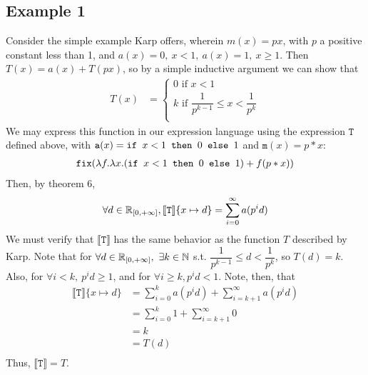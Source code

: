\subsection{Example 1}
Consider the simple example Karp offers, wherein $m(x) = px$, with $p$ a positive constant less than 1, and $a(x) = 0, \ x < 1, 
\ a(x) = 1, \ x \geq 1$. Then $T(x) = a(x) + T(px)$, so by a simple inductive argument we can show that 
\begin{align*}
T(x) &= 
 \begin{cases}
 0 \text{ if } x < 1 \\
 k \text{ if }  \dfrac{1}{p^{k-1}} \leq x < \dfrac{1}{p^k} \\
 \end{cases}
 \end{align*}
We may express this function in our expression language using the expression $\texttt{T}$ defined above, with 
$\texttt{a}(x) = \texttt{if } x<1 \texttt{ then } 0 \texttt{ else } 1$ and $\texttt{m}(x) = p*x$:
 \begin{align*}
 \texttt{fix}(\lambda f. \lambda x. (\texttt{if } x<1 \texttt{ then } 0 \texttt{ else } 1) + f (p * x))
 \end{align*}
 Then, by theorem 6,
 \begin{align*}
 \forall d \in \mathbb{R}_{[0,+\infty]}, \llbracket \texttt{T} \rrbracket\{x \mapsto d\} = \sum_{i=0}^{\infty}a(p^{i}d)
 \end{align*}
We must verify that $\llbracket \texttt{T} \rrbracket$ has the same behavior as the function $T$ described by Karp.
Note that for $\forall d \in \mathbb{R}_{[0,+\infty]}, \ \exists k \in \mathbb{N}$  s.t. $\dfrac{1}{p^{k-1}} \leq d < \dfrac{1}{p^k}$, so $T(d) = k$. Also, 
for $\forall i < k, \ p^id \geq 1$, and for $\forall i \geq k, p^id < 1$. Note, then, that
\begin{align*}
\llbracket \texttt{T} \rrbracket\{x\mapsto d\} &= \sum_{i=0}^{k} a(p^{i}d) + \sum_{i=k+1}^{\infty} a(p^{i}d) \\
&= \sum_{i=0}^{k} 1 + \sum_{i=k+1}^{\infty} 0\\
&= k \\
&= T(d) \\
\end{align*}
Thus, $\llbracket \texttt{T} \rrbracket = T$.

